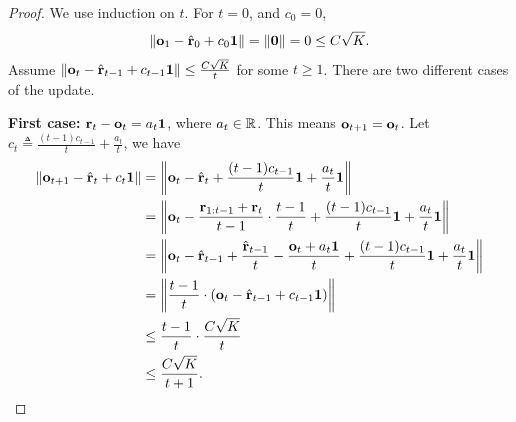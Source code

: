 \begin{proof}
We use induction on $t$. For $t=0$, and $c_0 = 0$,
\begin{equation*}
\begin{split}
    \left\| {\mathbf{o}}_{1} - \hat{{\mathbf{r}}}_0 + c_0 {\mathbf{1}} \right\| = \left\| {\mathbf{0}} \right\| = 0 \le C \sqrt{K}.
\end{split}
\end{equation*}
Assume $\left\| {\mathbf{o}}_{t} - \hat{{\mathbf{r}}}_{t-1} + c_{t-1} {\mathbf{1}} \right\| \le \frac{C \sqrt{K}}{t}$ for some $t \ge 1$. There  are two different cases of the update.

\textbf{First case:} ${\mathbf{r}}_t - {\mathbf{o}}_t = a_t {\mathbf{1}}$, where $a_t \in {\mathbb{R}}$. This means ${\mathbf{o}}_{t+1} = {\mathbf{o}}_{t}$. Let $c_t \triangleq \frac{(t-1)c_{t-1}}{t} +  \frac{a_t}{t}$, we have
\begin{equation*}
\begin{split}
    \left\| {\mathbf{o}}_{t+1} - \hat{{\mathbf{r}}}_t + c_t {\mathbf{1}} \right\| &= \left\| {\mathbf{o}}_{t} - \hat{{\mathbf{r}}}_t + \frac{(t-1)c_{t-1}}{t} {\mathbf{1}} + \frac{a_t}{t} {\mathbf{1}} \right\| \\
    &= \left\| {\mathbf{o}}_{t} - \frac{{\mathbf{r}}_{1:t-1} + {\mathbf{r}}_t}{t-1} \cdot \frac{t-1}{t} + \frac{(t-1)c_{t-1}}{t} {\mathbf{1}} + \frac{a_t}{t} {\mathbf{1}} \right\| \\
    &= \left\| {\mathbf{o}}_{t} - \hat{{\mathbf{r}}}_{t-1} + \frac{\hat{{\mathbf{r}}}_{t-1}}{t} - \frac{{\mathbf{o}}_t + a_t {\mathbf{1}}}{t} + \frac{(t-1)c_{t-1}}{t} {\mathbf{1}} + \frac{a_t}{t} {\mathbf{1}} \right\| \\
    &= \left\| \frac{t-1}{t} \cdot \left( {\mathbf{o}}_{t} - \hat{{\mathbf{r}}}_{t-1} + c_{t-1} {\mathbf{1}} \right) \right\| \\
    &\le \frac{t-1}{t} \cdot \frac{C \sqrt{K}}{t} \\
    &\le \frac{C \sqrt{K}}{t+1}.
\end{split}
\end{equation*}


\end{proof}
